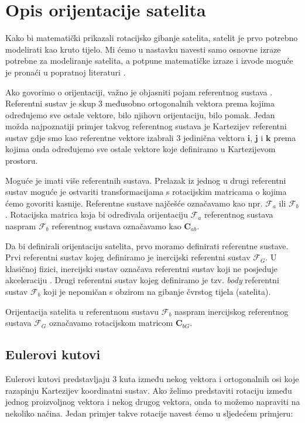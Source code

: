 \documentclass[times, utf8, diplomski, numeric]{templates/template}
\begin{document}
\chapter{Opis orijentacije satelita}{
    Kako bi matematički prikazali rotacijsko gibanje satelita, satelit je prvo potrebno modelirati kao kruto tijelo. Mi ćemo u nastavku navesti samo osnovne izraze potrebne za modeliranje satelita, a potpune matematičke izraze i izvode moguće je pronaći u popratnoj literaturi \cite{adcsKnjiga}.

    Ako govorimo o orijentaciji, važno je objasniti pojam referentnog sustava . Referentni sustav je skup 3 međusobno ortogonalnih vektora prema kojima određujemo sve ostale vektore, bilo njihovu orijentaciju, bilo pomak. Jedan možda najpoznatiji primjer takvog referentnog sustava je Kartezijev referentni sustav gdje smo kao referentne vektore izabrali 3 jedinična vektora $\boldsymbol{i}$, $\boldsymbol{j}$ i $\boldsymbol{k}$ prema kojima onda određujemo sve ostale vektore koje definiramo u Kartezijevom prostoru. 

    Moguće je imati više referentnih sustava. Prelazak iz jednog u drugi referentni sustav moguće je ostvariti transformacijama s rotacijskim matricama o kojima ćemo govoriti kasnije. Referentne sustave najčešće označavamo kao npr. $\mathcal{F}_a$ ili $\mathcal{F}_b$. Rotacijska matrica koja bi određivala orijentaciju $\mathcal{F}_a$ referentnog sustava naspram $\mathcal{F}_b$ referentnog sustava označavamo kao $\boldsymbol{C}_{ab}$.

    Da bi definirali orijentaciju satelita, prvo moramo definirati referentne sustave. Prvi referentni sustav kojeg definiramo je inercijski referentni sustav $\mathcal{F}_G$. U klasičnoj fizici, inercijski sustav označava referentni sustav koji ne posjeduje akceleraciju \cite{inertialFrame}. Drugi referentni sustav kojeg definiramo je tzv. \emph{body} referentni sustav $\mathcal{F}_b$ koji je nepomičan s obzirom na gibanje čvrstog tijela (satelita).

    Orijentacija satelita u referentnom sustavu $\mathcal{F}_b$ naspram inercijskog referentnog sustava $\mathcal{F}_G$ označavamo rotacijskom matricom $\boldsymbol{C}_{bG}$.

    \section{Eulerovi kutovi}{
        Eulerovi kutovi predstavljaju 3 kuta između nekog vektora i ortogonalnih osi koje razapinju Kartezijev koordinatni sustav. Ako želimo predstaviti rotaciju između jednog proizvoljnog vektora i nekog drugog vektora, onda to možemo napraviti na nekoliko načina. Jedan primjer takve rotacije navest ćemo u sljedećem primjeru:

}}
\end{document}

